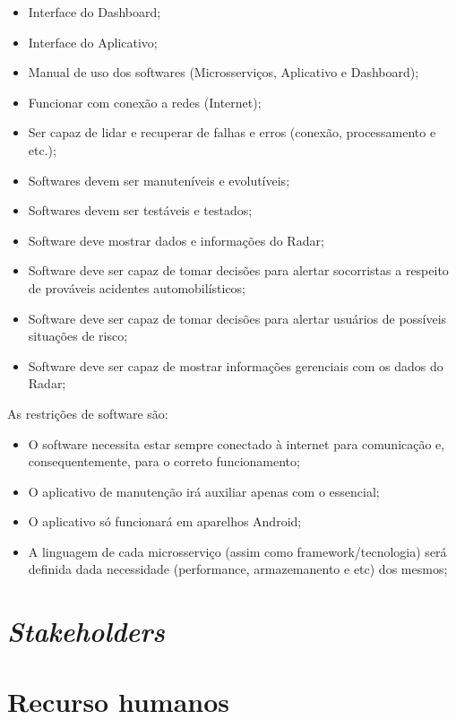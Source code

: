 \begin{itemize}
    \item Interface do Dashboard;
    \item Interface do Aplicativo;
    \item Manual de uso dos softwares (Microsserviços, Aplicativo e Dashboard);
    \item Funcionar com conexão a redes (Internet);
    \item Ser capaz de lidar e recuperar de falhas e erros (conexão, processamento e etc.);
    \item Softwares devem ser manuteníveis e evolutíveis;
    \item Softwares devem ser testáveis e testados;
    \item Software deve mostrar dados e informações do Radar;
    \item Software deve ser capaz de tomar decisões para alertar socorristas a respeito de prováveis acidentes automobilísticos;
    \item Software deve ser capaz de tomar decisões para alertar usuários de possíveis situações de risco;
    \item Software deve ser capaz de mostrar informações gerenciais com os dados do Radar;
\end{itemize}

As restrições de software são:

\begin{itemize}
    \item O software necessita estar sempre conectado à internet para comunicação e, consequentemente, para o correto funcionamento;
    \item O aplicativo de manutenção irá auxiliar apenas com o essencial;
    \item O aplicativo só funcionará em aparelhos Android;
    \item A linguagem de cada microsserviço (assim como framework/tecnologia) será definida dada necessidade (performance, armazemanento e etc) dos mesmos;
\end{itemize}

\section{\emph{Stakeholders}}
\section{Recurso humanos}

